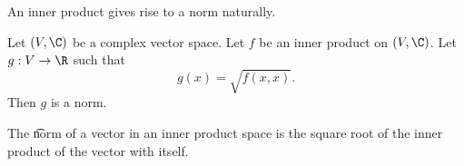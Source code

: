 

An inner product gives rise to a norm naturally.


\begin{prop}
Let $(V, \C)$ be a complex
vector space.
Let $f$ be an inner product on
$(V, \C)$.
Let $g: V \to \R$ such that
\[
  g(x) = \sqrt{f(x, x)}.
\]
Then $g$ is a norm.
\end{prop}

The \t{norm} of a vector in an inner product space is the square root of the inner product of the vector with itself.

